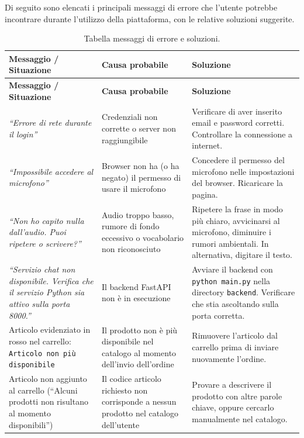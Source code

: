 Di seguito sono elencati i principali messaggi di errore che l'utente potrebbe incontrare durante l'utilizzo della piattaforma, con le relative soluzioni suggerite.

\begin{longtable}{|p{4cm}|p{4cm}|p{5.5cm}|}
    \caption{Tabella messaggi di errore e soluzioni.}
    \label{tab:errori} \\
    \hline
    \rowcolor{gray!10} \textbf{Messaggio / Situazione} & \textbf{Causa probabile} & \textbf{Soluzione} \\
    \hline
    \endfirsthead
    \hline
    \rowcolor{gray!10} \textbf{Messaggio / Situazione} & \textbf{Causa probabile} & \textbf{Soluzione} \\
    \hline
    \endhead
    \hline
    \endfoot

    \textit{``Errore di rete durante il login''} & Credenziali non corrette o server non raggiungibile & Verificare di aver inserito email e password corretti. Controllare la connessione a internet. \\
    \hline
    \textit{``Impossibile accedere al microfono''} & Browser non ha (o ha negato) il permesso di usare il microfono & Concedere il permesso del microfono nelle impostazioni del browser. Ricaricare la pagina. \\
    \hline
    \textit{``Non ho capito nulla dall'audio. Puoi ripetere o scrivere?''} & Audio troppo basso, rumore di fondo eccessivo o vocabolario non riconosciuto & Ripetere la frase in modo pi\`u chiaro, avvicinarsi al microfono, diminuire i rumori ambientali. In alternativa, digitare il testo. \\
    \hline
    \textit{``Servizio chat non disponibile. Verifica che il servizio Python sia attivo sulla porta 8000.''} & Il backend FastAPI non \`e in esecuzione & Avviare il backend con \texttt{python main.py} nella directory \texttt{backend}. Verificare che stia ascoltando sulla porta corretta. \\
    \hline
    Articolo evidenziato in rosso nel carrello: \texttt{Articolo non pi\`u disponibile} & Il prodotto non \`e pi\`u disponibile nel catalogo al momento dell'invio dell'ordine & Rimuovere l'articolo dal carrello prima di inviare nuovamente l'ordine. \\
    \hline
    Articolo non aggiunto al carrello (``Alcuni prodotti non risultano al momento disponibili'') & Il codice articolo richiesto non corrisponde a nessun prodotto nel catalogo dell'utente & Provare a descrivere il prodotto con altre parole chiave, oppure cercarlo manualmente nel catalogo. \\

\end{longtable}
